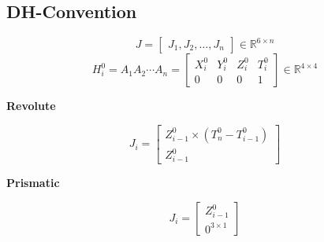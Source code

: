 \subsection{DH-Convention}
    \vspace{-0.5em}
    $$\boxed{
        J = \begin{bmatrix}
            J_1, J_2, \dots , J_n
        \end{bmatrix} \in \mathbb{R}^{6 \times n}
    }$$
    $$
        H_i^0 = A_1 A_2 \cdots A_n = 
        \begin{bmatrix}
            X_i^0 & Y_i^0 & Z_i^0 & T_i^0\\
            0 & 0 & 0 & 1
        \end{bmatrix}
        \in \mathbb{R}^{4 \times 4}
    $$
    \begin{minipage}{0.55\linewidth}
        \begin{center}
            \hspace{8mm}\textbf{Revolute}
        \end{center}
        $$
            J_i = 
            \begin{bmatrix}
                Z_{i-1}^0 \times \left( T_n^0 - T_{i-1}^0 \right) \\[1em]
                Z_{i-1}^0
            \end{bmatrix}
        $$
    \end{minipage}
    \begin{minipage}{0.44\linewidth}
        \begin{center}
            \hspace{7mm}\textbf{Prismatic}
        \end{center}
        $$
            J_i = 
            \begin{bmatrix}
                Z_{i-1}^0 \\[1em]
                0^{3 \times 1}
            \end{bmatrix}
        $$
    \end{minipage}